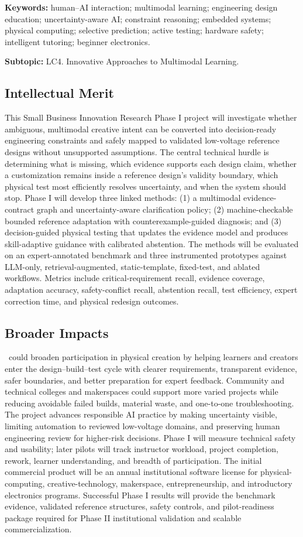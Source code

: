 \documentclass[11pt,letterpaper]{article}
\begin{document}
\textbf{Keywords:} human--AI interaction; multimodal learning; engineering design education; uncertainty-aware AI; constraint reasoning; embedded systems; physical computing; selective prediction; active testing; hardware safety; intelligent tutoring; beginner electronics.

\textbf{Subtopic:} LC4. Innovative Approaches to Multimodal Learning.

\subsection*{Intellectual Merit}
This Small Business Innovation Research Phase I project will investigate whether ambiguous, multimodal creative intent can be converted into decision-ready engineering constraints and safely mapped to validated low-voltage reference designs without unsupported assumptions. The central technical hurdle is determining what is missing, which evidence supports each design claim, whether a customization remains inside a reference design's validity boundary, which physical test most efficiently resolves uncertainty, and when the system should stop. Phase I will develop three linked methods: (1) a multimodal evidence-contract graph and uncertainty-aware clarification policy; (2) machine-checkable bounded reference adaptation with counterexample-guided diagnosis; and (3) decision-guided physical testing that updates the evidence model and produces skill-adaptive guidance with calibrated abstention. The methods will be evaluated on an expert-annotated benchmark and three instrumented prototypes against LLM-only, retrieval-augmented, static-template, fixed-test, and ablated workflows. Metrics include critical-requirement recall, evidence coverage, adaptation accuracy, safety-conflict recall, abstention recall, test efficiency, expert correction time, and physical redesign outcomes.

\subsection*{Broader Impacts}
\VibeFab\ could broaden participation in physical creation by helping learners and creators enter the design--build--test cycle with clearer requirements, transparent evidence, safer boundaries, and better preparation for expert feedback. Community and technical colleges and makerspaces could support more varied projects while reducing avoidable failed builds, material waste, and one-to-one troubleshooting. The project advances responsible AI practice by making uncertainty visible, limiting automation to reviewed low-voltage domains, and preserving human engineering review for higher-risk decisions. Phase I will measure technical safety and usability; later pilots will track instructor workload, project completion, rework, learner understanding, and breadth of participation. The initial commercial product will be an annual institutional software license for physical-computing, creative-technology, makerspace, entrepreneurship, and introductory electronics programs. Successful Phase I results will provide the benchmark evidence, validated reference structures, safety controls, and pilot-readiness package required for Phase II institutional validation and scalable commercialization.
\end{document}
